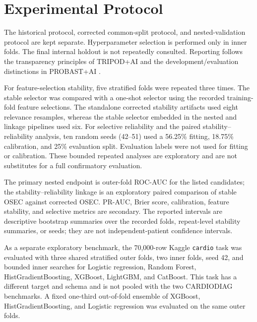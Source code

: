 \documentclass[journal]{IEEEtran}
\begin{document}
\section{Experimental Protocol}
The historical protocol, corrected common-split protocol, and nested-validation
protocol are kept separate. Hyperparameter selection is performed only in inner
folds. The final internal holdout is not repeatedly consulted. Reporting follows
the transparency principles of TRIPOD+AI \cite{collins2024tripodai} and the
development/evaluation distinctions in PROBAST+AI \cite{moons2025probastai}.

For feature-selection stability, five stratified folds were repeated three
times. The stable selector was compared with a one-shot selector using the
recorded training-fold feature selections. The standalone corrected stability artifacts used eight relevance resamples,
whereas the stable selector embedded in the nested and linkage pipelines used
six. For selective reliability and the paired stability--reliability analysis,
ten random seeds (42--51) used a 56.25\%
fitting, 18.75\% calibration, and 25\% evaluation split. Evaluation labels were
not used for fitting or calibration. These bounded repeated analyses are
exploratory and are not substitutes for a full confirmatory evaluation.

The primary nested endpoint is outer-fold ROC-AUC for the listed candidates;
the stability--reliability linkage is an exploratory paired comparison of
stable OSEC against corrected OSEC. PR-AUC, Brier score, calibration,
feature stability, and selective metrics are secondary. The reported intervals
are descriptive bootstrap summaries over the recorded folds, repeat-level
stability summaries, or seeds; they are not independent-patient confidence
intervals.

As a separate exploratory benchmark, the 70,000-row Kaggle \texttt{cardio}
task was evaluated with three shared stratified outer folds, two inner folds,
seed 42, and bounded inner searches for Logistic regression, Random Forest,
HistGradientBoosting, XGBoost, LightGBM, and CatBoost. This task has a
different target and schema and is not pooled with the two CARDIODIAG
benchmarks. A fixed one-third out-of-fold ensemble of XGBoost,
HistGradientBoosting, and Logistic regression was evaluated on the same outer
folds.
\end{document}
